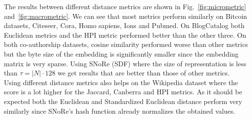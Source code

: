 \documentclass[twoside,11pt]{article}
\begin{document}
\renewcommand{\arraystretch}{1.5}
\begin{table}
\centering
\caption{Used distance metrics and their formulas.}
\label{tab:metrics}
\setlength{\tabcolsep}{3pt}
\end{table}
\renewcommand{\arraystretch}{1}

The results between different distance metrics are shown in Fig.~\ref{fig:micrometric} and~\ref{fig:macrometric}. We can see that most metrics perform similarly on Bitcoin datasets, Citeseer, Cora, Homo sapiens, Ions and Pubmed. On BlogCatalog both Euclidean metrics and the HPI metric performed better than the other three. On both co-authorship datasets, cosine similarity performed worse than other metrics but the byte size of the embedding is significantly smaller since the embedding matrix is very sparse. Using SNoRe (SDF) where the size of representation is less than $\tau = |N|\cdot 128$ we get results that are better than those of other metrics. Using different distance metrics also helps on the Wikipedia dataset where the score is a lot higher for the Jaccard, Canberra and HPI metrics. As it should be expected both the Euclidean and Standardized Euclidean distance perform very similarly since SNoRe's hash function already normalizes the obtained values.
\end{document}
